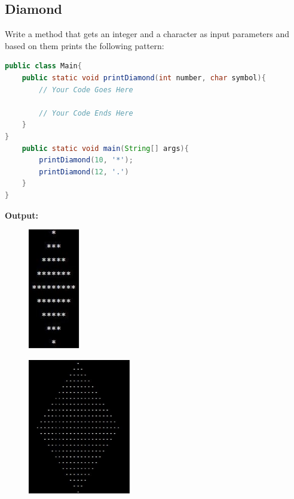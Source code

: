 \documentclass[12pt , a4paper]{article}
\begin{document}
	\subsection{Diamond}
Write a method that gets an integer and a character as input parameters and based on them prints the following pattern:
	\begin{lstlisting}[language=Java]
public class Main{
	public static void printDiamond(int number, char symbol){
		// Your Code Goes Here

		// Your Code Ends Here
	}
}
	public static void main(String[] args){
		printDiamond(10, '*');
		printDiamond(12, '.')
	}
}
	\end{lstlisting}

	\begin{tcolorbox}
	\textbf{Output:}\\
\begin{figure}[H]
\centering
\includegraphics[width=0.2\textwidth]{5-1.jpg}
\caption*{}
\label{f-0-0}
\end{figure}
%
\begin{figure}[H]
\centering
\includegraphics[width=0.4\textwidth]{5-2.jpg}
\caption*{}
\label{f-0-0}
\end{figure}
	\end{tcolorbox}
\end{document}
